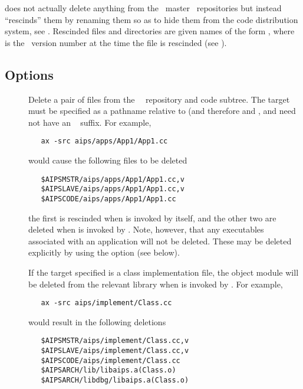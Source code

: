  does not actually delete anything from the \aipspp\ master
\rcs\ repositories but instead ``rescinds'' them by renaming them so as to
hide them from the code distribution system, see .  Rescinded
files and directories are given names of the form ,
where  is the \aipspp\ version number at the time the file is
rescinded (see ).

\subsection*{Options}

\begin{description}
\item[]
   Delete a pair of files from the \aipspp\ \rcs\ repository and code subtree.
   The target must be specified as a pathname relative to 
   (and therefore  and , and need not have
   an \rcs\  suffix.  For example,

\begin{verbatim}
   ax -src aips/apps/App1/App1.cc
\end{verbatim}

   \noindent
   would cause the following files to be deleted

\begin{verbatim}
   $AIPSMSTR/aips/apps/App1/App1.cc,v
   $AIPSLAVE/aips/apps/App1/App1.cc,v
   $AIPSCODE/aips/apps/App1/App1.cc
\end{verbatim}

   \noindent
   the first is rescinded when  is invoked by  itself,
   and the other two are deleted when  is invoked by
   .  Note, however, that any executables associated with an
   application will not be deleted.  These may be deleted explicitly by using
   the  option (see below).

   \noindent
   If the target specified is a class implementation file, the object module
   will be deleted from the relevant library when  is invoked
   by .  For example,

\begin{verbatim}
   ax -src aips/implement/Class.cc
\end{verbatim}

   \noindent
   would result in the following deletions

\begin{verbatim}
   $AIPSMSTR/aips/implement/Class.cc,v
   $AIPSLAVE/aips/implement/Class.cc,v
   $AIPSCODE/aips/implement/Class.cc
   $AIPSARCH/lib/libaips.a(Class.o)
   $AIPSARCH/libdbg/libaips.a(Class.o)
\end{verbatim}


\end{description}
